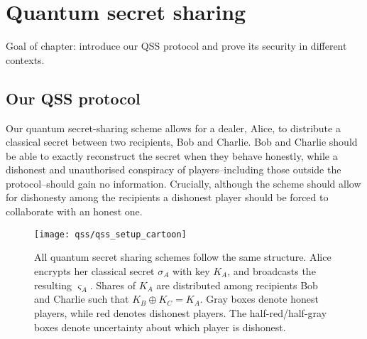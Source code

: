 %

\chapter{Quantum secret sharing}
Goal of chapter: introduce our QSS protocol and prove its security in different contexts.

\iffalse
Key results which I want to present:
\begin{itemize}
\item our QSS protocol
\item security proof (what does it do? what does it not do?)
\item analysis of security in various settings - heterodyne, $\mathcal{A}_4$, BS0, BS1, BS2, EC, varying $\alpha$, $T$, $\xi$, $g$, $h$ of both channels
\item show how the protocol performs
\end{itemize}
\fi


\section{Our QSS protocol}

Our quantum secret-sharing scheme allows for a dealer, Alice, to distribute a classical secret between two recipients, Bob and Charlie. Bob and Charlie should be able to exactly reconstruct the secret when they behave honestly, while a dishonest and unauthorised conspiracy of players--including those outside the protocol--should gain no information. Crucially, although the scheme should allow for dishonesty among the recipients a dishonest player should be forced to collaborate with an honest one.

\begin{figure}[htp]
\centering
\texttt{[image: qss/qss\_setup\_cartoon]}
\caption{\label{fig:qss_structure} All quantum secret sharing schemes follow the same structure. Alice encrypts her classical secret $\sigma_A$ with key $K_A$, and broadcasts the resulting $\varsigma_A$. Shares of $K_A$ are distributed among recipients Bob and Charlie such that $K_B \oplus K_C = K_A$. Gray boxes denote honest players, while red denotes dishonest players. The half-red/half-gray boxes denote uncertainty about which player is dishonest. %
}
\end{figure}

